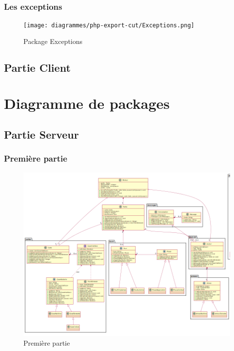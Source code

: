 		\subsubsection{Les exceptions}
			\vspace{10mm}
			\begin{figure}[!h]
				\centering
                \texttt{[image: diagrammes/php-export-cut/Exceptions.png]}
				\caption{Package Exceptions}
			\end{figure}
		\newpage
	\subsection{Partie Client}

\section{Diagramme de packages}
	\subsection{Partie Serveur}
		\subsubsection{Première partie}
			\vspace{10mm}
			\begin{figure}[!h]
				\centering
				\includegraphics[angle=90,width=150mm]{images/DP1.png}
				\caption{Première partie}
			\end{figure}

